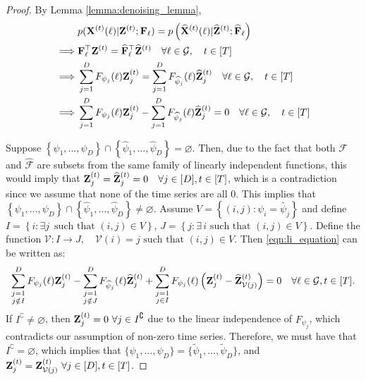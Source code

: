 \begin{proof}
    By Lemma \ref{lemma:denoising_lemma},
    \begin{align}
        &p(\mathbf{X}^{(t)}(\ell) | \mathbf{Z}^{(t)} ; \mathbf{F}_{\ell}) = p \left(\widehat{\mathbf{X}}^{(t)}(\ell)| \widehat{\mathbf{Z}}^{(t)}; \widehat{\mathbf{F}}_{\ell} \right) \nonumber \\
         \implies &\mathbf{F}_{\ell}^\top \mathbf{Z}^{(t)} = \widehat{\mathbf{F}}_{\ell}^\top \widehat{\mathbf{Z}}^{(t)} \quad \forall \ell \in \mathcal{G}, \quad t \in [T] \nonumber \\
        \implies  &\sum_{j=1}^D F_{\psi_j}(\ell) \mathbf{Z}^{(t)}_j =  \sum_{j=1}^D {F}_{\widehat{\psi}_j}(\ell) \widehat{\mathbf{Z}}^{(t)}_j \quad \forall \ell \in \mathcal{G}, \quad t \in [T] \nonumber \\
        \implies  &\sum_{j=1}^D F_{\psi_j}(\ell) \mathbf{Z}^{(t)}_j  -  \sum_{j=1}^D {F}_{\widehat{\psi}_j}(\ell) \widehat{\mathbf{Z}}^{(t)}_{j} = 0 \quad \forall \ell \in \mathcal{G}, \quad t \in [T] \label{eqn:li_equation}
    \end{align}
    
    Suppose $\displaystyle \left\{ \psi_1, \ldots, \psi_D \right\} \cap \left\{ \widehat{\psi}_1, \ldots, \widehat{\psi}_D \right\} = \varnothing$. Then, due to the fact that both $\mathcal{F}$ and $\widehat{\mathcal{F}}$ are subsets from the same family of linearly independent functions, this would imply that $\displaystyle \mathbf{Z}^{(t)}_j = \widehat{\mathbf{Z}}^{(t)}_j = 0 \quad \forall j \in [D], t \in [T]$, which is a contradiction since we assume that none of the time series are all 0. This implies that $\displaystyle \left\{ \psi_1, \ldots, \psi_D \right\} \cap \left\{ \widehat{\psi}_1, \ldots, \widehat{\psi}_D \right\}  \neq \varnothing$.
    Assume $\displaystyle V = \left\{ (i,j) : \psi_i = \tilde{\psi_j} \right\}$ and define $\displaystyle I = \left\{ i : \exists j \, \text{ such that } (i, j) \in V\right\}$, $\displaystyle J = \left\{ j : \exists \, i \text{ such that } (i, j) \in V\right\}$. Define the function $\displaystyle \mathcal{V} : I \rightarrow J, \quad \mathcal{V}(i) = j \text{ such that } (i, j) \in V$.
    Then \eqref{eqn:li_equation} can be written as:
    \begin{align*}
         \sum_{\substack{j=1 \\ j \notin I}}^D F_{\psi_j}(\ell) \mathbf{Z}^{(t)}_j  -  \sum_{\substack{j=1 \\ j \notin J}}^D {F}_{\widehat{\psi}_j}(\ell) \widehat{\mathbf{Z}}^{(t)}_j + \sum_{\substack{j=1 \\ j \in I}}^D {F}_{{\psi_j}}(\ell) \left(\mathbf{Z}^{(t)}_j - \widehat{\mathbf{Z}}^{(t)}_{\mathcal{V}(j)} \right) = 0 \quad \forall \ell \in \mathcal{G}, t \in [T].
    \end{align*}
    If $I^\complement \neq \varnothing$, then $\displaystyle \mathbf{Z}^{(t)}_j =0 \, \, \forall  j \in I^\complement$ due to the linear independence of $\displaystyle F_{\psi_j}$, which contradicts our assumption of non-zero time series. Therefore, we must have that $I^\complement = \varnothing$, which implies that  $\displaystyle \{ \psi_1, \ldots, \psi_D\} = \{ \tilde{\psi}_1, \ldots, \tilde{\psi}_D\}$, and $\mathbf{Z}^{(t)}_j = \mathbf{Z}^{(t)}_{\mathcal{V}(j)} \, \, \forall j \in [D], t \in [T]$.
\end{proof} 


